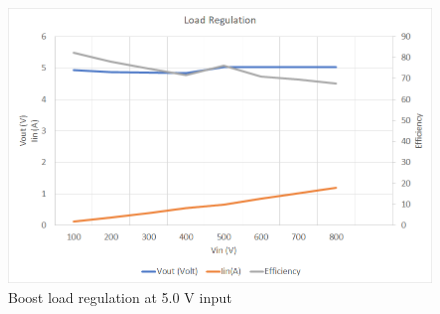 \begin{figure}[H]
	\centering
	\includegraphics[width=\columnwidth]{IMGS/Boost load regulation at 5V Vin.png}
	\caption{Boost load regulation at 5.0 V input}
	\label{fig:arch}
\end{figure}

